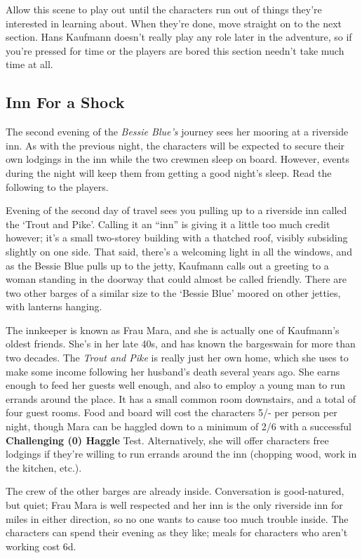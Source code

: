 Allow this scene to play out until the characters run out of things they're
interested in learning about. When they're done, move straight on to the
next section. Hans Kaufmann doesn't really play any role later in the adventure,
so if you're pressed for time or the players are bored this section needn't take
much time at all.

\subsection{Inn For a Shock}\label{act1scene2}
The second evening of the \textit{Bessie Blue's} journey sees her mooring at
a riverside inn. As with the previous night, the characters will be expected to
secure their own lodgings in the inn while the two crewmen sleep on board.
However, events during the night will keep them from getting a good night's
sleep. Read the following to the players.

\begin{callout}
Evening of the second day of travel sees you pulling up to a riverside inn
called the `Trout and Pike'. Calling it an ``inn'' is giving it a little too much
credit however; it's a small two-storey building with a thatched roof, visibly
subsiding slightly on one side. That said, there's a welcoming light in all the
windows, and as the Bessie Blue pulls up to the jetty, Kaufmann calls
out a greeting to a woman standing in the doorway that could almost be called
friendly. There are two other barges of a similar size to the `Bessie Blue'
moored on other jetties, with lanterns hanging.
\end{callout}

The innkeeper is known as Frau Mara, and she is actually one of Kaufmann's
oldest friends. She's in her late 40s, and has known the bargeswain for more
than two decades. The \textit{Trout and Pike} is really just her own home,
which she uses to make some income following her husband's death several years
ago. She earns enough to feed her guests well enough, and also to employ a
young man to run errands around the place. It has a small common room downstairs,
and a total of four guest rooms. Food and board will cost the characters 5/- per
person per night, though Mara can be haggled down to a minimum of 2/6 with a
successful \textbf{Challenging (0) Haggle} Test. Alternatively, she will offer
characters free lodgings if they're willing to run errands around the inn
(chopping wood, work in the kitchen, etc.).

The crew of the other barges are already inside. Conversation is good-natured,
but quiet; Frau Mara is well respected and her inn is the only riverside inn for
miles in either direction, so no one wants to cause too much trouble inside.
The characters can spend their evening as they like; meals for characters who
aren't working cost 6d.
